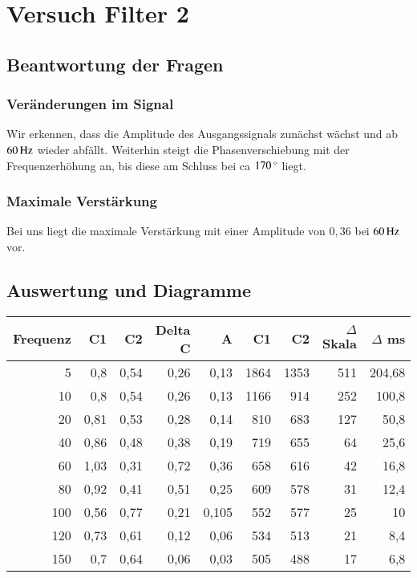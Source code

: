 \newpage



\section{Versuch Filter 2}


\subsection{Beantwortung der Fragen}


\subsubsection*{Veränderungen im Signal}

Wir erkennen, dass die Amplitude des Ausgangssignals zunächst wächst und ab $\unit[60]{Hz}$ wieder abfällt. Weiterhin steigt die Phasenverschiebung mit der Frequenzerhöhung an, bis diese am Schluss bei ca $\unit[170]{^\circ}$ liegt.


\subsubsection*{Maximale Verstärkung}

Bei uns liegt die maximale Verstärkung mit einer Amplitude von $0,36$ bei $\unit[60]{Hz}$ vor.



\subsection{Auswertung und Diagramme}



\begin{tabular}{r|r|r|r|r|r|r|r|r}
Frequenz & C1    & C2    & Delta C & A     & C1    & C2    & $\Delta$ Skala & $\Delta$ ms \\
\hline
5     & 0,8   & 0,54  & 0,26  & 0,13  & 1864  & 1353  & 511   & 204,68 \\
10    & 0,8   & 0,54  & 0,26  & 0,13  & 1166  & 914   & 252   & 100,8 \\
20    & 0,81  & 0,53  & 0,28  & 0,14  & 810   & 683   & 127   & 50,8 \\
40    & 0,86  & 0,48  & 0,38  & 0,19  & 719   & 655   & 64    & 25,6 \\
60    & 1,03  & 0,31  & 0,72  & 0,36  & 658   & 616   & 42    & 16,8 \\
80    & 0,92  & 0,41  & 0,51  & 0,25  & 609   & 578   & 31    & 12,4 \\
100   & 0,56  & 0,77  & 0,21  & 0,105 & 552   & 577   & 25    & 10 \\
120   & 0,73  & 0,61  & 0,12  & 0,06  & 534   & 513   & 21    & 8,4 \\
150   & 0,7   & 0,64  & 0,06  & 0,03  & 505   & 488   & 17    & 6,8 \\
\end{tabular}%

